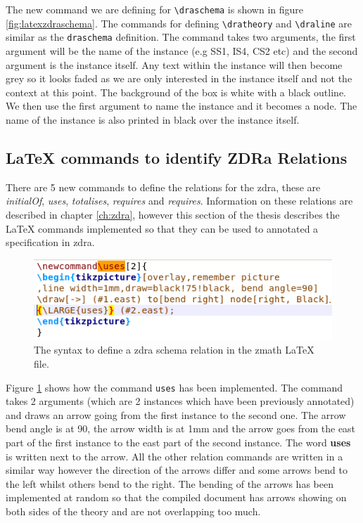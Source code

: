The new command we are defining for \verb|\draschema| is shown in figure \ref{fig:latexzdraschema}. The commands for defining \verb|\dratheory| and \verb|\draline| are similar as the \verb|draschema| definition. The command takes two arguments, the first argument will be the name of the instance (e.g SS1, IS4, CS2 etc) and the second argument is the instance itself. Any text within the instance will then become grey so it looks faded as we are only interested in the instance itself and not the context at this point. The background of the box is white with a black outline. We then use the first argument to name the instance and it becomes a node. The name of the instance is also printed in black over the instance itself.

\subsection{\LaTeX{} commands to identify ZDRa Relations}

There are 5 new commands to define the relations for the \gls{zdra}, these are \emph{initialOf}, \emph{uses}, \emph{totalises}, \emph{requires} and \emph{requires}. Information on these relations are described in chapter \ref{ch:zdra}, however this section of the thesis describes the \LaTeX{} commands implemented so that they can be used to annotated a specification in \gls{zdra}.

\begin{figure}[H]
\includegraphics[scale=0.7]{Figures/Design/zmathd.png}
\caption{The syntax to define a \gls{zdra} schema relation in the \gls{zmath} \LaTeX{} file. \label{fig:latexzdrauses}}
\end{figure}

Figure \ref{fig:latexzdrauses} shows how the command \verb|uses| has been implemented. The command takes 2 arguments (which are 2 instances which have been previously annotated) and draws an arrow going from the first instance to the second one. The arrow bend angle is at 90, the arrow width is at 1mm and the arrow goes from the east part of the first instance to the east part of the second instance. The word \textbf{uses} is written next to the arrow. All the other relation commands are written in a similar way however the direction of the arrows differ and some arrows bend to the left whilst others bend to the right. The bending of the arrows has been implemented at random so that the compiled document has arrows showing on both sides of the theory and are not overlapping too much.

